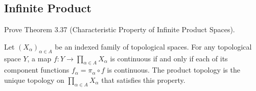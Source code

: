 \subsection*{Infinite Product}

\begin{exercise}{3.38}
    Prove Theorem 3.37 (Characteristic Property of Infinite Product Spaces).

    Let ${(X_{\alpha})}_{\alpha\in A}$ be an indexed family of topological spaces. For any topological space $Y$, a map $f: Y\to \prod_{\alpha\in A}X_{\alpha}$ is continuous if and only if each of its component functions $f_{\alpha} = \pi_{\alpha}\circ f$ is continuous. The product topology is the unique topology on $\prod_{\alpha\in A}X_{\alpha}$ that satisfies this property.
\end{exercise}

